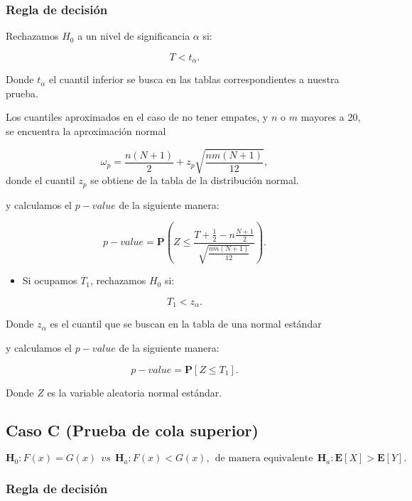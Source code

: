 \documentclass[
  a4paper,
  oneside,
  openany]{book}
\providecommand{\tightlist}{%
  \setlength{\itemsep}{0pt}\setlength{\parskip}{0pt}}
\begin{document}
\hypertarget{regla-de-decisiuxf3n-14}{%
\subsubsection*{Regla de decisión}\label{regla-de-decisiuxf3n-14}}


Rechazamos \(H_0\) a un nivel de significancia \(\alpha\) si:

\[T < t_{\alpha}.\]

Donde \(t_{\alpha}\) el cuantil inferior se busca en las tablas correspondientes a nuestra prueba.

Los cuantiles aproximados en el caso de no tener empates, y \(n\) o \(m\) mayores a 20, se encuentra la aproximación normal

\[\omega_p= \frac{n(N+1)}{2} + z_p\sqrt{\frac{n m(N+1)}{12}},\]
donde el cuantil \(z_p\) se obtiene de la tabla de la distribución normal.

y calculamos el \(p-value\) de la siguiente manera:

\[p-value = \mathbf{P}\left(Z\leq\frac{T+\frac{1}{2}-n\frac{N+1}{2}}{\sqrt{\frac{nm(N+1)}{12}}}\right).\]

\begin{itemize}
\tightlist
\item
  Si ocupamos \(T_{1}\), rechazamos \(H_0\) si:
\end{itemize}

\[T_{1} < z_{\alpha}.\]

Donde \(z_{\alpha}\) es el cuantil que se buscan en la tabla de una normal estándar

y calculamos el \(p-value\) de la siguiente manera:

\[p-value=\mathbf{P}[Z\leq T_{1}].\]

Donde \(Z\) es la variable aleatoria normal estándar.

\hypertarget{caso-c-prueba-de-cola-superior-4}{%
\subsection*{Caso C (Prueba de cola superior)}\label{caso-c-prueba-de-cola-superior-4}}


\[\textbf{H}_0: F(x) = G(x) \ \ vs \ \ \textbf{H}_a: F(x) < G(x), \  \ \mbox{de manera equivalente} \ \ \textbf{H}_a:\mathbf{E}[X]  > \mathbf{E}[Y].\]

\hypertarget{regla-de-decisiuxf3n-15}{%
\subsubsection*{Regla de decisión}\label{regla-de-decisiuxf3n-15}}
\end{document}
